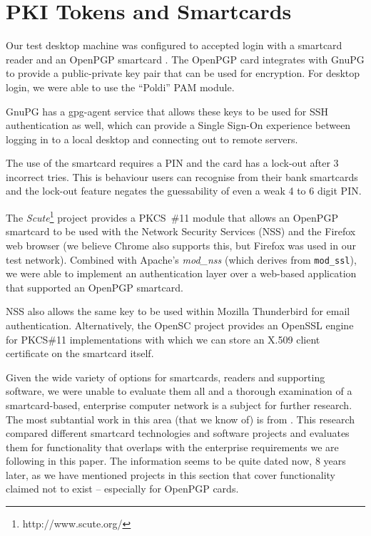 \documentclass{report}
\begin{document}
\section{PKI Tokens and Smartcards}

Our test desktop machine was configured to accepted login with a smartcard
reader and an OpenPGP smartcard \parencite{pietig2009functional}. The OpenPGP
card integrates with GnuPG to provide a public-private key pair that can
be used for encryption. For desktop login, we were able to use the ``Poldi''
PAM module.

GnuPG has a gpg-agent service that allows these keys to be used for SSH
authentication as well, which can provide a Single Sign-On experience
between logging in to a local desktop and connecting out to remote servers.

The use of the
smartcard requires a PIN and the card has a lock-out after 3 incorrect tries.
This is behaviour users can recognise from their bank smartcards and the
lock-out feature negates the guessability of even a weak 4 to 6 digit PIN.

The \emph{Scute}\footnote{http://www.scute.org/}
project provides a PKCS~\#11 module that allows an OpenPGP
smartcard to be used with the Network Security Services (NSS) and
the Firefox web browser (we believe Chrome also supports this, but Firefox
was used in our test network). Combined with Apache's \emph{mod\_nss} (which
derives from \texttt{mod\_ssl}), we were able to implement an authentication layer
over a web-based application that supported an OpenPGP smartcard.

NSS also allows the same key to be used within Mozilla Thunderbird for
email authentication. Alternatively, the OpenSC project provides an
OpenSSL engine for PKCS\#11 implementations with which we can store an X.509
client certificate on the smartcard itself.

Given the wide variety of
options for smartcards, readers and supporting software, we were unable
to evaluate them all and a thorough examination of a smartcard-based,
enterprise computer network is a subject for further research. The most
subtantial work in this area (that we know of) is from \textcite{grossesecuring}.
This research compared different smartcard technologies and software projects
and evaluates them for functionality that overlaps with the enterprise
requirements we are following in this paper. The information seems to be
quite dated now, 8 years later, as we have mentioned projects in this
section that cover functionality claimed not to exist -- especially for OpenPGP
cards.
\end{document}
